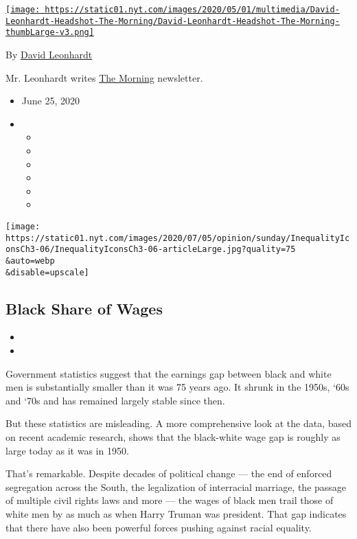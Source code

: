 \href{https://www.nytimes.com/by/david-leonhardt}{\texttt{[image: https://static01.nyt.com/images/2020/05/01/multimedia/David-Leonhardt-Headshot-The-Morning/David-Leonhardt-Headshot-The-Morning-thumbLarge-v3.png]}}

By \href{https://www.nytimes.com/by/david-leonhardt}{David Leonhardt}

Mr. Leonhardt writes
\href{https://www.nytimes.com/series/us-morning-briefing}{The Morning}
newsletter.

\begin{itemize}
\item
  June 25, 2020
\item
  \begin{itemize}
  \item
  \item
  \item
  \item
  \item
  \item
  \end{itemize}
\end{itemize}

\texttt{[image: https://static01.nyt.com/images/2020/07/05/opinion/sunday/InequalityIconsCh3-06/InequalityIconsCh3-06-articleLarge.jpg?quality=75\\\&auto=webp\\\&disable=upscale]}

\hypertarget{black-share-of-wages}{%
\subsection{Black Share of Wages}\label{black-share-of-wages}}

\begin{itemize}
\item
\item
\end{itemize}

Government statistics suggest that the earnings gap between black and
white men is substantially smaller than it was 75 years ago. It shrunk
in the 1950s, `60s and `70s and has remained largely stable since then.

But these statistics are misleading. A more comprehensive look at the
data, based on recent academic research, shows that the black-white wage
gap is roughly as large today as it was in 1950.

That's remarkable. Despite decades of political change --- the end of
enforced segregation across the South, the legalization of interracial
marriage, the passage of multiple civil rights laws and more --- the
wages of black men trail those of white men by as much as when Harry
Truman was president. That gap indicates that there have also been
powerful forces pushing against racial equality.

